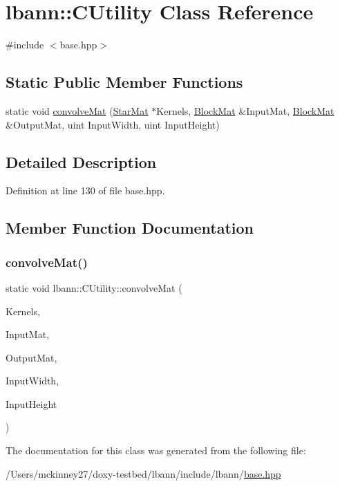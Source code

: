 \hypertarget{classlbann_1_1CUtility}{}\section{lbann\+:\+:C\+Utility Class Reference}
\label{classlbann_1_1CUtility}


{\ttfamily \#include $<$base.\+hpp$>$}

\subsection*{Static Public Member Functions}
\begin{DoxyCompactItemize}
\item 
static void \hyperlink{classlbann_1_1CUtility_a70867a001ddcc7c71ab62a334ff89eca}{convolve\+Mat} (\hyperlink{base_8hpp_aba08580d21767b53d0737e115d738dbe}{Star\+Mat} $\ast$Kernels, \hyperlink{base_8hpp_a4bb44b4dc43ffb6dc862bca1b4cef243}{Block\+Mat} \&Input\+Mat, \hyperlink{base_8hpp_a4bb44b4dc43ffb6dc862bca1b4cef243}{Block\+Mat} \&Output\+Mat, uint Input\+Width, uint Input\+Height)
\end{DoxyCompactItemize}


\subsection{Detailed Description}


Definition at line 130 of file base.\+hpp.



\subsection{Member Function Documentation}
\mbox{\label{classlbann_1_1CUtility_a70867a001ddcc7c71ab62a334ff89eca}} 
\subsubsection{\texorpdfstring{convolve\+Mat()}{convolveMat()}}
{\footnotesize\ttfamily static void lbann\+::\+C\+Utility\+::convolve\+Mat (\begin{DoxyParamCaption}\item[{\hyperlink{base_8hpp_aba08580d21767b53d0737e115d738dbe}{Star\+Mat} $\ast$}]{Kernels,  }\item[{\hyperlink{base_8hpp_a4bb44b4dc43ffb6dc862bca1b4cef243}{Block\+Mat} \&}]{Input\+Mat,  }\item[{\hyperlink{base_8hpp_a4bb44b4dc43ffb6dc862bca1b4cef243}{Block\+Mat} \&}]{Output\+Mat,  }\item[{uint}]{Input\+Width,  }\item[{uint}]{Input\+Height }\end{DoxyParamCaption})\hspace{0.3cm}{\ttfamily [static]}}



The documentation for this class was generated from the following file\+:\begin{DoxyCompactItemize}
\item 
/\+Users/mckinney27/doxy-\/testbed/lbann/include/lbann/\hyperlink{base_8hpp}{base.\+hpp}\end{DoxyCompactItemize}
